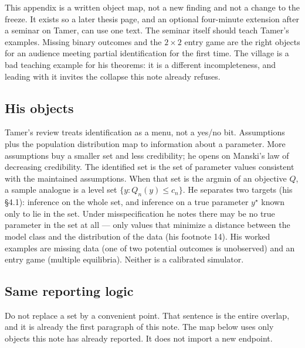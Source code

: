 \documentclass[11pt]{article}
\begin{document}
This appendix is a written object map, not a new finding and not a
change to the freeze. It exists so a later thesis page, and an optional
four-minute extension after a seminar on Tamer, can use one text.
The seminar itself should teach Tamer's examples. Missing binary
outcomes and the \(2\times 2\) entry game are the right objects for an
audience meeting partial identification for the first time. The village
is a bad teaching example for his theorems: it is a different
incompleteness, and leading with it invites the collapse this note
already refuses.

\subsection{His objects}
Tamer's review treats identification as a menu, not a yes/no bit.
Assumptions plus the population distribution map to information about a
parameter. More assumptions buy a smaller set and less credibility; he
opens on Manski's law of decreasing credibility. The identified set is
the set of parameter values consistent with the maintained assumptions.
When that set is the argmin of an objective \(Q\), a sample analogue is
a level set \(\{y:Q_n(y)\le c_n\}\). He separates two targets
(his \S4.1): inference on the whole set, and inference on a true
parameter \(y^\star\) known only to lie in the set. Under
misspecification he notes there may be no true parameter in the set at
all --- only values that minimize a distance between the model class
and the distribution of the data (his footnote 14). His worked examples
are missing data (one of two potential outcomes is unobserved) and an
entry game (multiple equilibria). Neither is a calibrated simulator.

\subsection{Same reporting logic}
Do not replace a set by a convenient point. That sentence is the entire
overlap, and it is already the first paragraph of this note. The map
below uses only objects this note has already reported. It does not
import a new endpoint.
\end{document}
